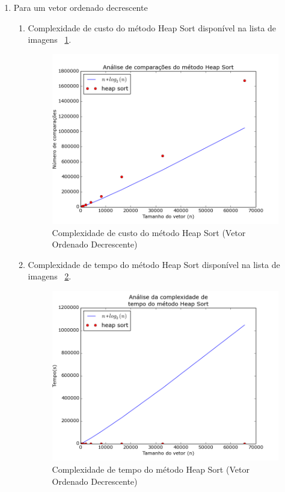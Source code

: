 \documentclass[12pt,a4paper,twoside]{report}
\begin{document}
\begin{enumerate}
\begin{enumerate}
		\end{enumerate}
	
		
		
		\item Para um vetor ordenado decrescente
				\begin{enumerate}
					\item Complexidade de custo do método Heap Sort disponível na lista de imagens ~\ref{fig:HeapPlot1OD}.
					\begin{figure}[!h]
						\centering
						\includegraphics[scale=0.6]{../imagens/Heap/heap_plot_1_ordenado_decrescente.png}
						\caption{Complexidade de custo do método Heap Sort (Vetor Ordenado Decrescente) \label{fig:HeapPlot1OD}}
					\end{figure}
					
					
					\item Complexidade de tempo do método Heap Sort disponível na lista de imagens ~\ref{fig:HeapPlot2OD}.
					\begin{figure}[!h]
						\centering
					\includegraphics[scale=0.6]{../imagens/Heap/heap_plot_2_ordenado_decrescente.png}
						\caption{Complexidade de tempo do método Heap Sort (Vetor Ordenado Decrescente) \label{fig:HeapPlot2OD}}
					\end{figure}
					

\end{enumerate}
\end{enumerate}
\end{document}
